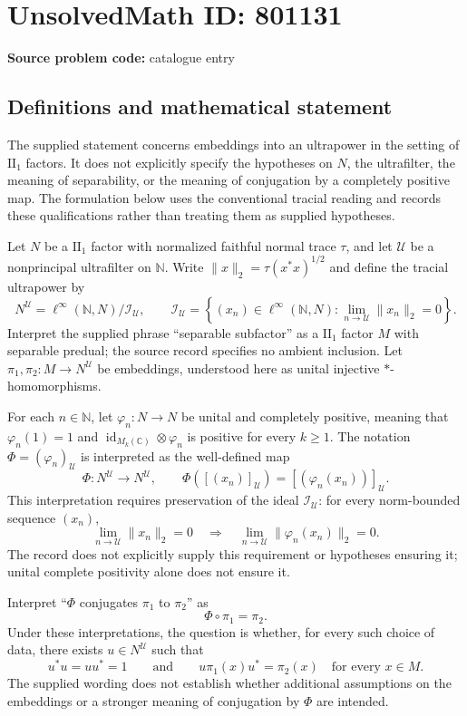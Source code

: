 \documentclass[11pt]{article}
\newcommand{\N}{\mathbb{N}}
\newcommand{\C}{\mathbb{C}}
\begin{document}
\section*{UnsolvedMath ID: 801131}
\textbf{Source problem code:} catalogue entry
\subsection{Definitions and mathematical statement}
The supplied statement concerns embeddings into an ultrapower in the setting of \(\mathrm{II}_1\) factors. It does not explicitly specify the hypotheses on \(N\), the ultrafilter, the meaning of separability, or the meaning of conjugation by a completely positive map. The formulation below uses the conventional tracial reading and records these qualifications rather than treating them as supplied hypotheses.

Let \(N\) be a \(\mathrm{II}_1\) factor with normalized faithful normal trace \(\tau\), and let \(\mathcal U\) be a nonprincipal ultrafilter on \(\N\). Write \(\|x\|_2=\tau(x^*x)^{1/2}\) and define the tracial ultrapower by
\[
N^{\mathcal U}=\ell^\infty(\N,N)/\mathcal I_{\mathcal U},\qquad
\mathcal I_{\mathcal U}=\left\{(x_n)\in\ell^\infty(\N,N):\lim_{n\to\mathcal U}\|x_n\|_2=0\right\}.
\]
Interpret the supplied phrase ``separable subfactor'' as a \(\mathrm{II}_1\) factor \(M\) with separable predual; the source record specifies no ambient inclusion. Let \(\pi_1,\pi_2:M\to N^{\mathcal U}\) be embeddings, understood here as unital injective \(*\)-homomorphisms.

For each \(n\in\N\), let \(\varphi_n:N\to N\) be unital and completely positive, meaning that \(\varphi_n(1)=1\) and \(\operatorname{id}_{M_k(\C)}\otimes\varphi_n\) is positive for every \(k\geq1\). The notation \(\Phi=(\varphi_n)_{\mathcal U}\) is interpreted as the well-defined map
\[
\Phi:N^{\mathcal U}\longrightarrow N^{\mathcal U},\qquad
\Phi([(x_n)]_{\mathcal U})=[(\varphi_n(x_n))]_{\mathcal U}.
\]
This interpretation requires preservation of the ideal \(\mathcal I_{\mathcal U}\): for every norm-bounded sequence \((x_n)\),
\[
\lim_{n\to\mathcal U}\|x_n\|_2=0
\quad\Longrightarrow\quad
\lim_{n\to\mathcal U}\|\varphi_n(x_n)\|_2=0.
\]
The record does not explicitly supply this requirement or hypotheses ensuring it; unital complete positivity alone does not ensure it.

Interpret ``\(\Phi\) conjugates \(\pi_1\) to \(\pi_2\)'' as
\[
\Phi\circ\pi_1=\pi_2.
\]
Under these interpretations, the question is whether, for every such choice of data, there exists \(u\in N^{\mathcal U}\) such that
\[
u^*u=uu^*=1
\qquad\text{and}\qquad
u\pi_1(x)u^*=\pi_2(x)\quad\text{for every }x\in M.
\]
The supplied wording does not establish whether additional assumptions on the embeddings or a stronger meaning of conjugation by \(\Phi\) are intended.
\end{document}
